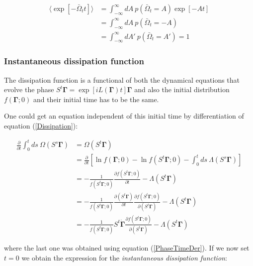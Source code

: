 \documentclass[a4paper,12pt,nofootinbib]{article}
\begin{document}
\begin{equation}
\begin{aligned}
  \langle \exp[-\bar{\Omega}_t t] \rangle &= \int_{-\infty}^{\infty} dA\ p(\bar{\Omega}_t=A)\exp[-A t]\\
  &=\int_{-\infty}^{\infty} dA\ p(\bar{\Omega}_t=-A)\\
  &=\int_{-\infty}^{\infty} dA'\ p(\bar{\Omega}_t=A')=1
\end{aligned}
\end{equation}


\subsubsection{Instantaneous dissipation function}

The dissipation function is a functional of both the dynamical equations that evolve the phase $S^t \bm{\Gamma} = \exp[iL(\bm{\Gamma})t]\bm{\Gamma}$ and also the initial distribution $f(\bm{\Gamma};0)$ and their initial time has to be the same.

One could get an equation independent of this initial time by differentiation of equation (\ref{Dissipation}):

\begin{equation}
\begin{aligned}
  \frac{\partial}{\partial t}\int_0^t ds\ \Omega(S^s  \bm{\Gamma}) &= \Omega(S^t \bm{\Gamma})\\
  &=\frac{\partial}{\partial t}[\ln{f(\bm{\Gamma};0)}-\ln{f(S^t\bm{\Gamma};0)}
-\int_0^t ds \ \Lambda(S^s \bm{\Gamma})
]\\
&=-\frac{1}{f(S^t\bm{\Gamma};0)}\frac{\partial f(S^t\bm{\Gamma};0)}{\partial t}-\Lambda(S^t \bm{\Gamma})\\
&=-\frac{1}{f(S^t\bm{\Gamma};0)}\frac{\partial( S^t \bm{\Gamma})}{\partial t}\frac{\partial f(S^t\bm{\Gamma};0)}{\partial(S^t \bm{\Gamma})}-\Lambda(S^t \bm{\Gamma})\\
&=-\frac{1}{f(S^t\bm{\Gamma};0)}S^t\dot{\bm{\Gamma}}
\frac{\partial f(S^t\bm{\Gamma};0)}{\partial(S^t \bm{\Gamma})}-\Lambda(S^t \bm{\Gamma})
\end{aligned}
\end{equation}

where the last one was obtained using equation (\ref{PhaseTimeDer}). 
If we now set $t=0$ we obtain the expression for the \textit{instantaneous dissipation function}:
\end{document}
